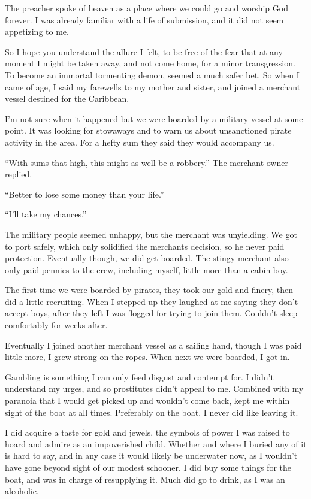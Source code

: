 The preacher spoke of heaven as a place where we could go and worship God
forever. I was already familiar with a life of submission, and it did not seem
appetizing to me.

So I hope you understand the allure I felt, to be free of the fear that at any
moment I might be taken away, and not come home, for a minor transgression. To
become an immortal tormenting demon, seemed a much safer bet.  So when I came of
age, I said my farewells to my mother and sister, and joined a merchant vessel
destined for the Caribbean.

I’m not sure when it happened but we were boarded by a military vessel at some point. It was looking for stowaways and to warn us about unsanctioned pirate activity in the area. For a hefty sum they said they would accompany us.

“With sums that high, this might as well be a robbery.” The merchant owner replied.

“Better to lose some money than your life.”

“I’ll take my chances.”

The military people seemed unhappy, but the merchant was unyielding.  We got to port safely, which only solidified the merchants decision, so he never paid protection.  Eventually though, we did get boarded.   The stingy merchant also only paid pennies to the crew, including myself, little more than a cabin boy.

The first time we were boarded by pirates, they took our gold and finery, then did a little recruiting. When I stepped up they laughed at me saying they don’t accept boys, after they left I was flogged for trying to join them.  Couldn’t sleep comfortably for weeks after.

Eventually I joined another merchant vessel as a sailing hand, though I was paid little more, I grew strong on the ropes.  When next we were boarded, I got in.

Gambling is something I can only feed disgust and contempt for. I didn’t
understand my urges, and so prostitutes didn’t appeal to me. 
Combined with my paranoia that I would get picked up and wouldn’t come back, 
kept me within sight of the boat at all times. Preferably on the boat.  
I never did like leaving it.

I did acquire a taste for gold and jewels, the symbols of power I was raised to hoard and admire as an impoverished child. Whether and where I buried any of it is hard to say, and in any case it would likely be underwater now, as I wouldn’t have gone beyond sight of our modest schooner.  I did buy some things for the boat, and was in charge of resupplying it.  Much did go to drink, as I was an alcoholic.

